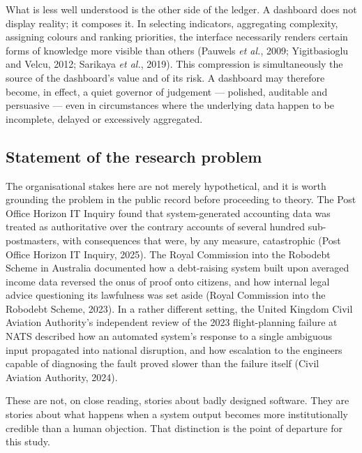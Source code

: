 \documentclass[11pt,a4paper]{article}
\numberwithin{figure}{section}
\numberwithin{table}{section}
\newcommand{\ct}[1]{\textcolor{citeblue}{#1}}          %
\begin{document}
What is less well understood is the other side of the ledger. A dashboard does not display
reality; it composes it. In selecting indicators, aggregating complexity, assigning colours and
ranking priorities, the interface necessarily renders certain forms of knowledge more visible
than others \ct{(Pauwels \emph{et al.}, 2009; Yigitbasioglu and Velcu, 2012; Sarikaya \emph{et
al.}, 2019)}. This compression is simultaneously the source of the dashboard's value and of its
risk. A dashboard may therefore become, in effect, a quiet governor of judgement --- polished,
auditable and persuasive --- even in circumstances where the underlying data happen to be
incomplete, delayed or excessively aggregated.

\subsection{Statement of the research problem}

The organisational stakes here are not merely hypothetical, and it is worth grounding the problem
in the public record before proceeding to theory. The Post Office Horizon IT Inquiry found that
system-generated accounting data was treated as authoritative over the contrary accounts of
several hundred sub-postmasters, with consequences that were, by any measure, catastrophic
\ct{(Post Office Horizon IT Inquiry, 2025)}. The Royal Commission into the Robodebt Scheme in
Australia documented how a debt-raising system built upon averaged income data reversed the onus
of proof onto citizens, and how internal legal advice questioning its lawfulness was set aside
\ct{(Royal Commission into the Robodebt Scheme, 2023)}. In a rather different setting, the United
Kingdom Civil Aviation Authority's independent review of the 2023 flight-planning failure at NATS
described how an automated system's response to a single ambiguous input propagated into national
disruption, and how escalation to the engineers capable of diagnosing the fault proved slower than
the failure itself \ct{(Civil Aviation Authority, 2024)}.

These are not, on close reading, stories about badly designed software. They are stories about
what happens when a system output becomes more institutionally credible than a human objection.
That distinction is the point of departure for this study.
\end{document}
